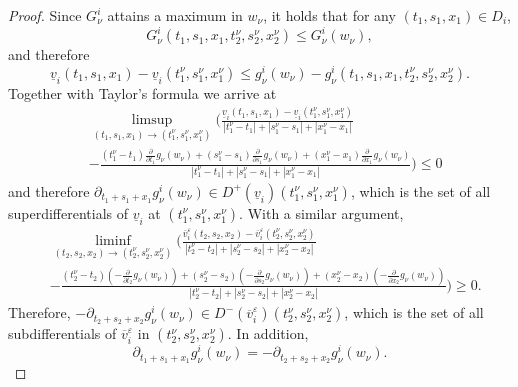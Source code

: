 \documentclass[10pt,a4paper]{amsart}
\begin{document}
\begin{proof}
    \noindent
    Since $G_\nu^i$ attains a maximum in $w_\nu$, it holds that for any $(t_1,s_1,x_1) \in D_i$, 
    \begin{equation*}
        G_\nu^i(t_1,s_1,x_1,t_2^\nu,s_2^\nu,x_2^\nu)\leq G_\nu^i(w_\nu),
    \end{equation*}
    and therefore
    \begin{equation*}
        \underline{v}_i(t_1,s_1,x_1)-\underline{v}_i(t_1^\nu,s_1^\nu,x_1^\nu)\leq g_\nu^i(w_\nu)-g_\nu^i (t_1,s_1,x_1,t_2^\nu,s_2^\nu,x_2^\nu).
    \end{equation*}
    Together with Taylor's formula we arrive at
    \begin{align*}&\limsup_{(t_1,s_1,x_1)\rightarrow (t_1^\nu,s_1^\nu,x_1^\nu)}\biggl(\frac{ \underline{v}_i(t_1,s_1,x_1)-\underline{v}_i(t_1^\nu,s_1^\nu,x_1^\nu)}{|t_1^\nu-t_1|+|s_1^\nu-s_1|+|x_1^\nu-x_1|}\\
        &-\frac{ (t_1^\nu-t_1)\frac{\partial}{\partial t_1}g_\nu(w_\nu)+(s_1^\nu-s_1)\frac{\partial}{\partial s_1}g_\nu(w_\nu)+(x_1^\nu-x_1)\frac{\partial}{\partial x_1}g_\nu(w_\nu)}{|t_1^\nu-t_1|+|s_1^\nu-s_1|+|x_1^\nu-x_1|}\biggr)\leq 0
    \end{align*}
    and therefore $\partial_{t_1+s_1+x_1} g_\nu^i(w_\nu) \in D^+ (\underline{v}_i)(t_1^\nu,s_1^\nu,x_1^\nu)$, which is the set of all superdifferentials of $\underline{v}_i$ at $(t_1^\nu,s_1^\nu,x_1^\nu)$.
    With a similar argument,
     \begin{align*}
        &\liminf_{(t_2,s_2,x_2)\rightarrow (t_2^\nu,s_2^\nu,x_2^\nu)} \biggl(\frac{ \overline{v}^\varepsilon_i(t_2,s_2,x_2)-\overline{v}^\varepsilon_i(t_2^\nu,s_2^\nu,x_2^\nu)}{|t_2^\nu-t_2|+|s_2^\nu-s_2|+|x_2^\nu-x_2|}\\
        &-\frac{(t_2^\nu-t_2)(-\frac{\partial}{\partial t_2}g_\nu(w_\nu))+(s_2^\nu-s_2)(-\frac{\partial}{\partial s_2}g_\nu(w_\nu))+(x_2^\nu-x_2)(-\frac{\partial}{\partial x_2}g_\nu(w_\nu))}{|t_2^\nu-t_2|+|s_2^\nu-s_2|+|x_2^\nu-x_2|}\biggr)\geq 0.
    \end{align*}
    Therefore, $-\partial_{t_2+s_2+x_2} g_\nu^i(w_\nu) \in D^- (\overline{v}^\varepsilon_i)(t_2^\nu,s_2^\nu,x_2^\nu)$, which is the set of all subdifferentials of $\overline{v}^\varepsilon_i$ in $(t_2^\nu,s_2^\nu,x_2^\nu)$. In addition, 
    \begin{equation}
    \label{eq:g_x=-g_y}
        \partial_{t_1+s_1+x_1} g_\nu^i(w_\nu)=-\partial_{t_2+s_2+x_2} g_\nu^i(w_\nu).
    \end{equation}
    

\end{proof}
\end{document}
